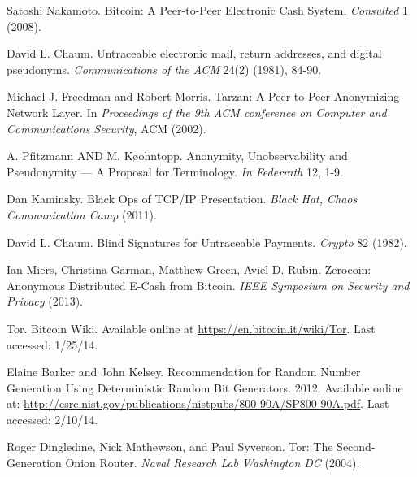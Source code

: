 \documentclass[conference]{IEEEtran}
\begin{document}







\begin{thebibliography}{1}

 Satoshi Nakamoto. Bitcoin: A Peer-to-Peer Electronic Cash System. \emph{Consulted} 1 (2008).

 David L. Chaum. Untraceable electronic mail, return addresses, and digital pseudonyms. \emph{Communications of the ACM} 24(2) (1981), 84-90.

 Michael J. Freedman and Robert Morris. Tarzan: A Peer-to-Peer Anonymizing Network Layer. In \emph{Proceedings of the 9th ACM conference on Computer and Communications Security}, ACM (2002).

 A. Pfitzmann AND M. K\o{o}hntopp. Anonymity, Unobservability and Pseudonymity — A Proposal for Terminology. \emph{In Federrath} 12, 1-9.

 Dan Kaminsky. Black Ops of TCP/IP Presentation. \emph{Black Hat, Chaos Communication Camp} (2011).

 David L. Chaum. Blind Signatures for Untraceable Payments. \emph{Crypto} 82 (1982).

 Ian Miers, Christina Garman, Matthew Green, Aviel D. Rubin. Zerocoin: Anonymous Distributed E-Cash from Bitcoin. \emph{IEEE Symposium on Security and Privacy} (2013).

 Tor. Bitcoin Wiki. Available online at \url{https://en.bitcoin.it/wiki/Tor}. Last accessed: 1/25/14.

 Elaine Barker and John Kelsey. Recommendation for Random Number Generation Using Deterministic Random Bit Generators. 2012. Available online at: \url{http://csrc.nist.gov/publications/nistpubs/800-90A/SP800-90A.pdf}. Last accessed: 2/10/14. 

 Roger Dingledine, Nick Mathewson, and Paul Syverson. Tor: The Second-Generation Onion Router. \emph{Naval Research Lab Washington DC} (2004).




\end{thebibliography}
\end{document}
